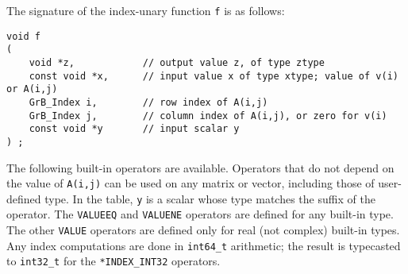 \documentclass[12pt]{article}
\begin{document}
{The signature of the index-unary function \verb'f' is as follows:

{\footnotesize
\begin{verbatim}
void f
(
    void *z,            // output value z, of type ztype
    const void *x,      // input value x of type xtype; value of v(i) or A(i,j)
    GrB_Index i,        // row index of A(i,j)
    GrB_Index j,        // column index of A(i,j), or zero for v(i)
    const void *y       // input scalar y
) ; \end{verbatim}}

The following built-in operators are available.  Operators that do not depend
on the value of \verb'A(i,j)' can be used on any matrix or vector, including
those of user-defined type.  In the table, \verb'y' is a
scalar whose type matches the suffix of the operator.  The \verb'VALUEEQ' and
\verb'VALUENE' operators are defined for any built-in type. The other
\verb'VALUE' operators are defined only for real (not complex) built-in types.
Any index computations are done in \verb'int64_t' arithmetic; the result is
typecasted to \verb'int32_t' for the \verb'*INDEX_INT32' operators.

}
\end{document}
